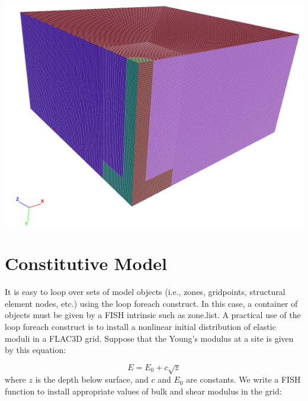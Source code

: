 \documentclass[a4paper, nobind]{templates/ociamthesis}
\begin{document}
\includegraphics[width=1\linewidth]{myfigureeeeee/model}

\hypertarget{constitutive-model}{%
\section{Constitutive Model}\label{constitutive-model}}

It is easy to loop over sets of model objects (i.e., zones, gridpoints, structural element nodes, etc.) using the loop foreach construct. In this case, a container of objects must be given by a FISH intrinsic such as zone.list. A practical use of the loop foreach construct is to install a nonlinear initial distribution of elastic moduli in a FLAC3D grid. Suppose that the Young's modulus at a site is given by this equation:

\[ E = E_0 + c \sqrt{z}  \] where \(z\) is the depth below surface, and \(c\)
and \(E_0\) are constants. We write a FISH function to install appropriate
values of bulk and shear modulus in the grid:
\end{document}
